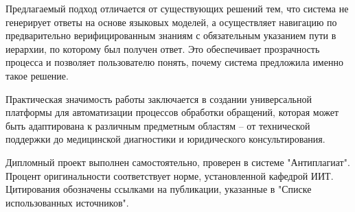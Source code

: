 Предлагаемый подход отличается от существующих решений тем, что система не генерирует ответы на основе языковых моделей, а осуществляет навигацию по предварительно верифицированным знаниям с обязательным указанием пути в иерархии, по которому был получен ответ. Это обеспечивает прозрачность процесса и позволяет пользователю понять, почему система предложила именно такое решение.

Практическая значимость работы заключается в создании универсальной платформы для автоматизации процессов обработки обращений, которая может быть адаптирована к различным предметным областям – от технической поддержки до медицинской диагностики и юридического консультирования.

Дипломный проект выполнен самостоятельно, проверен в системе "Антиплагиат". Процент оригинальности соответствует норме, установленной кафедрой ИИТ. Цитирования обозначены ссылками на публикации, указанные в "Списке использованных источников".